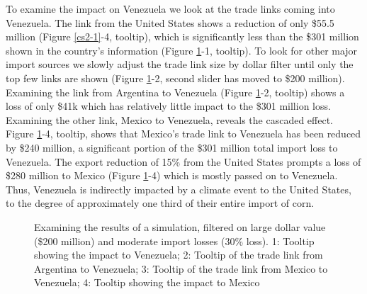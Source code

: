 To examine the impact on Venezuela we look at the trade links coming into Venezuela. The link from the United States shows a reduction of only \$55.5 million (Figure \ref{cs2-1}-4, tooltip), which is significantly less than the \$301 million shown in the country's information (Figure \ref{cs2-3}-1, tooltip). To look for other major import sources we slowly adjust the trade link size by dollar filter until only the top few links are shown (Figure \ref{cs2-3}-2, second slider has moved to \$200 million). Examining the link from Argentina to Venezuela (Figure \ref{cs2-3}-2, tooltip) shows a loss of only \$41k which has relatively little impact to the \$301 million loss. Examining the other link, Mexico to Venezuela, reveals the cascaded effect. Figure \ref{cs2-3}-4, tooltip, shows that Mexico's trade link to Venezuela has been reduced by \$240 million, a significant portion of the \$301 million total import loss to Venezuela. The export reduction of 15\% from the United States prompts a loss of \$280 million to Mexico (Figure \ref{cs2-3}-4) which is mostly passed on to Venezuela. Thus, Venezuela is indirectly impacted by a climate event to the United States, to the degree of approximately one third of their entire import of corn.\par
\begin{figure}[htb]
	\caption[EXAMINING THE RESULTS OF A SIMULATION, FILTERED ON LARGE DOLLAR VALUE (\$200 MILLION) AND MODERATE IMPORT LOSSES (30\% LOSS)]{Examining the results of a simulation, filtered on large dollar value (\$200 million) and moderate import losses (30\% loss). 1: {Tooltip showing the impact to Venezuela}; 2: {Tooltip of the trade link from Argentina to Venezuela}; 3: {Tooltip of the trade link from Mexico to Venezuela}; 4: {Tooltip showing the impact to Mexico} }
	\label{cs2-3}
\end{figure}
